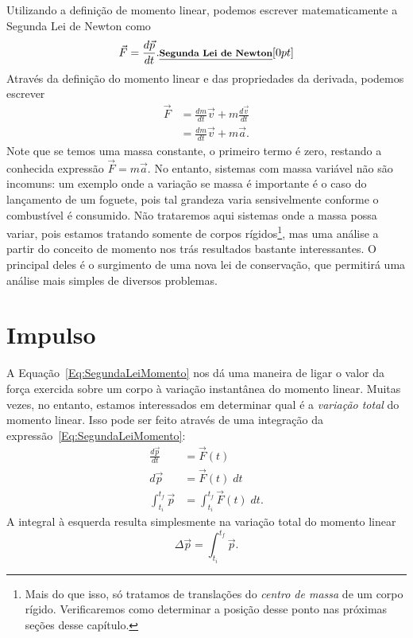 Utilizando a definição de momento linear, podemos escrever matematicamente a Segunda Lei de Newton como
\begin{equation}\label{Eq:SegundaLeiMomento}
    \vec{F} = \frac{d\vec{p}}{dt}. \relax{\footnotesize\emph{\textbf{Segunda Lei de Newton}}}[0pt]
\end{equation}
%
Através da definição do momento linear e das propriedades da derivada, podemos escrever
\begin{align}
    \vec{F} &= \frac{dm}{dt}\vec{v} + m\frac{d\vec{v}}{dt} \\
    &= \frac{dm}{dt}\vec{v} + m\vec{a}.
\end{align}
%
Note que se temos uma massa constante, o primeiro termo é zero, restando a conhecida expressão $\vec{F} = m\vec{a}$. No entanto, sistemas com massa variável não são incomuns: um exemplo onde a variação se massa é importante é o caso do lançamento de um foguete, pois tal grandeza varia sensivelmente conforme o combustível é consumido. Não trataremos aqui sistemas onde a massa possa variar, pois estamos tratando somente de corpos rígidos\footnote{Mais do que isso, só tratamos de translações do \emph{centro de massa} de um corpo rígido. Verificaremos como determinar a posição desse ponto nas próximas seções desse capítulo.}, mas uma análise a partir do conceito de momento nos trás resultados bastante interessantes. O principal deles é o surgimento de uma nova lei de conservação, que permitirá uma análise mais simples de diversos problemas.

\section{Impulso}

A Equação~\eqref{Eq:SegundaLeiMomento} nos dá uma maneira de ligar o valor da força exercida sobre um corpo à variação instantânea do momento linear. Muitas vezes, no entanto, estamos interessados em determinar qual é a \emph{variação total} do momento linear. Isso pode ser feito através de uma integração da expressão~\eqref{Eq:SegundaLeiMomento}:
\begin{align}\label{Eq:SegundaLeiIntegrando}
    \frac{d\vec{p}}{dt} &= \vec{F}(t) \\
    d\vec{p} &= \vec{F}(t) \; dt \\
    \int_{t_i}^{t_f} \vec{p} &= \int_{t_i}^{t_f} \vec{F}(t) \; dt.
\end{align} 
%
A integral à esquerda resulta simplesmente na variação total do momento linear
\begin{equation}
    \Delta \vec{p} = \int_{t_i}^{t_f} \vec{p}.
\end{equation}

